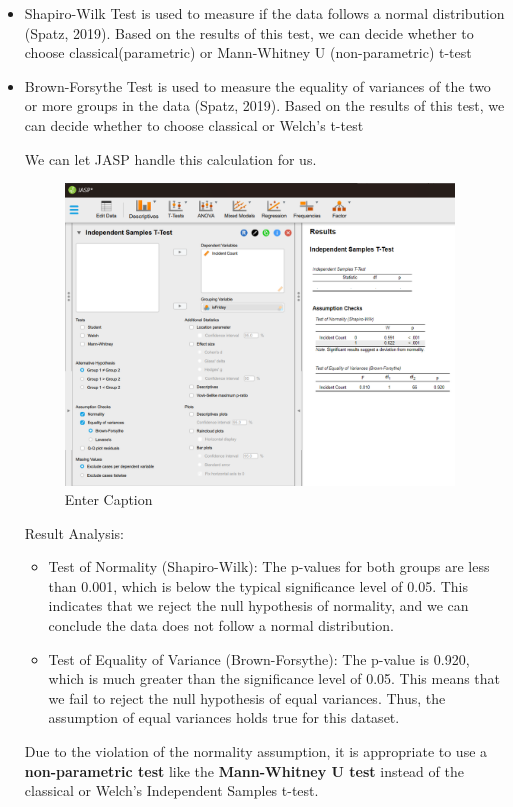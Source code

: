 \documentclass{article}
\begin{document}
\begin{itemize}
    \item Shapiro-Wilk Test is used to measure if the data follows a normal distribution (Spatz, 2019). Based on the results of this test, we can decide whether to choose classical(parametric) or Mann-Whitney U (non-parametric) t-test

    \item Brown-Forsythe Test is used to measure the equality of variances of the two or more groups in the data (Spatz, 2019). Based on the results of this test, we can decide whether to choose classical or Welch's t-test
    
    We can let JASP handle this calculation for us.

    \begin{figure}[H]
        \centering
        \includegraphics[width=0.7\linewidth, height=8cm]{resources/Screenshot 2024-09-27 230725.png}
        \caption{Enter Caption}
        \label{fig:enter-label}
    \end{figure}

    Result Analysis:

    \begin{itemize}
        \item Test of Normality (Shapiro-Wilk): The p-values for both groups are less than 0.001, which is below the typical significance level of 0.05. This indicates that we reject the null hypothesis of normality, and we can conclude the data does not follow a normal distribution.

        \item Test of Equality of Variance (Brown-Forsythe): The p-value is 0.920, which is much greater than the significance level of 0.05. This means that we fail to reject the null hypothesis of equal variances. Thus, the assumption of equal variances holds true for this dataset.
    \end{itemize}

    Due to the violation of the normality assumption, it is appropriate to use a \textbf{non-parametric test} like the\textbf{ Mann-Whitney U test} instead of the classical or Welch's Independent Samples t-test.
    
\end{itemize}
\end{document}
